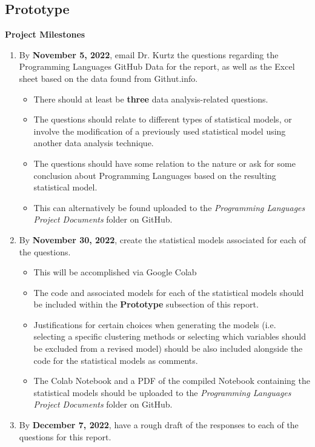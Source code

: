 \documentclass{article}
\theoremstyle{theorem}
\theoremstyle{definition}
\theoremstyle{remark}
\begin{document}
\subsection{Prototype}
\textbf{Project Milestones}
\begin{enumerate}
    \item By \textbf{November 5, 2022}, email Dr. Kurtz the questions regarding the Programming Languages GitHub Data for the report, as well as the Excel sheet based on the data found from Githut.info.
    \begin{itemize}
        \item There should at least be \textbf{three} data analysis-related questions.
        \item The questions should relate to different types of statistical models, or involve the modification of a previously used statistical model using another data analysis technique.
        \item The questions should have some relation to the nature or ask for some conclusion about Programming Languages based on the resulting statistical model.
        \item This can alternatively be found uploaded to the \textit{Programming Languages Project Documents} folder on GitHub.
    \end{itemize}
    \item By \textbf{November 30, 2022}, create the statistical models associated for each of the questions.
    \begin{itemize}
        \item This will be accomplished via Google Colab
        \item The code and associated models for each of the statistical models should be included within the \textbf{Prototype} subsection of this report.
        \item Justifications for certain choices when generating the models (i.e. selecting a specific clustering methods or selecting which variables should be excluded from a revised model) should be also included alongside the code for the statistical models as comments.
        \item The Colab Notebook and a PDF of the compiled Notebook containing the statistical models should be uploaded to the \textit{Programming Languages Project Documents} folder on GitHub.
    \end{itemize}
    \item By \textbf{December 7, 2022}, have a rough draft of the responses to each of the questions for this report.

\end{enumerate}
\end{document}
